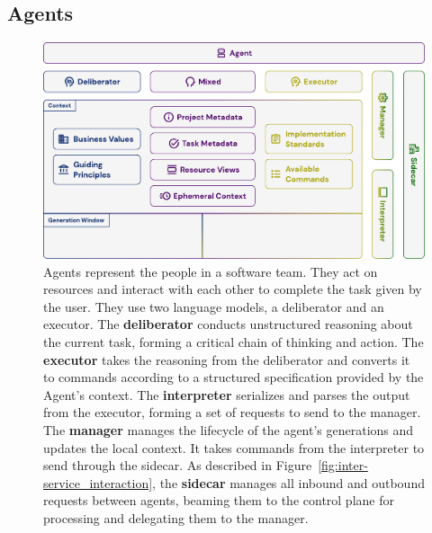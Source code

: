 \documentclass[a4paper,twocolumn,11pt]{quantumarticle}
\begin{document}
\subsection{Agents}
\begin{figure}[t]
  \centering
  \includegraphics[width=\textwidth]{figures/agent.pdf}
  \caption{Agents represent the people in a software team. They act on resources and interact with each other to complete the task given by the user. They use two language models, a deliberator and an executor. The \textbf{deliberator} conducts unstructured reasoning about the current task, forming a critical chain of thinking and action. The \textbf{executor} takes the reasoning from the deliberator and converts it to commands according to a structured specification provided by the Agent's context. The \textbf{interpreter} serializes and parses the output from the executor, forming a set of requests to send to the manager. The \textbf{manager} manages the lifecycle of the agent's generations and updates the local context. It takes commands from the interpreter to send through the sidecar. As described in Figure~\ref{fig:inter-service_interaction}, the \textbf{sidecar} manages all inbound and outbound requests between agents, beaming them to the control plane for processing and delegating them to the manager.}
  \label{fig:agent}
\end{figure}

\end{document}
